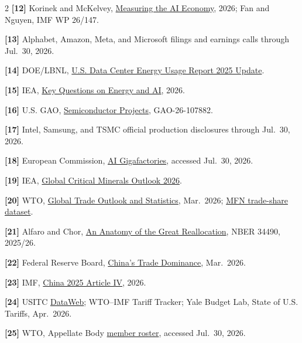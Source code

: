 \documentclass[10pt,letterpaper]{article}
\begin{document}
{\begin{multicols}{2}
\textbf{[12]} Korinek and McKelvey, \href{https://papers.ssrn.com/sol3/papers.cfm?abstract_id=6813982}{Measuring the AI Economy}, 2026; Fan and Nguyen, IMF WP 26/147.

\textbf{[13]} Alphabet, Amazon, Meta, and Microsoft filings and earnings calls through Jul.\ 30, 2026.

\textbf{[14]} DOE/LBNL, \href{https://www.energy.gov/powering-americas-ai-future-data-center-resource-hub}{U.S. Data Center Energy Usage Report 2025 Update}.

\textbf{[15]} IEA, \href{https://www.iea.org/reports/key-questions-on-energy-and-ai/executive-summary}{Key Questions on Energy and AI}, 2026.

\textbf{[16]} U.S. GAO, \href{https://www.gao.gov/products/gao-26-107882}{Semiconductor Projects}, GAO-26-107882.

\textbf{[17]} Intel, Samsung, and TSMC official production disclosures through Jul.\ 30, 2026.

\textbf{[18]} European Commission, \href{https://commission.europa.eu/topics/competitiveness/competitiveness-coordination-tool-projects/ai-gigafactories_en}{AI Gigafactories}, accessed Jul.\ 30, 2026.

\textbf{[19]} IEA, \href{https://www.iea.org/reports/global-critical-minerals-outlook-2026/executive-summary}{Global Critical Minerals Outlook 2026}.

\textbf{[20]} WTO, \href{https://www.wto.org/english/news_e/news26_e/stat_19mar26_329_e.htm}{Global Trade Outlook and Statistics}, Mar.\ 2026; \href{https://data.wto.org/en/dataset/mfnshare}{MFN trade-share dataset}.

\textbf{[21]} Alfaro and Chor, \href{https://www.nber.org/papers/w34490}{An Anatomy of the Great Reallocation}, NBER 34490, 2025/26.

\textbf{[22]} Federal Reserve Board, \href{https://www.federalreserve.gov/econres/notes/feds-notes/chinas-trade-dominance-and-the-role-of-industrial-policies-20260323.html}{China's Trade Dominance}, Mar.\ 2026.

\textbf{[23]} IMF, \href{https://www.imf.org/-/media/files/publications/cr/2026/english/1chnea2026001-source-pdf.pdf}{China 2025 Article IV}, 2026.

\textbf{[24]} USITC \href{https://dataweb.usitc.gov/}{DataWeb}; WTO--IMF Tariff Tracker; Yale Budget Lab, State of U.S. Tariffs, Apr.\ 2026.

\textbf{[25]} WTO, Appellate Body \href{https://www.wto.org/english/tratop_e/dispu_e/ab_members_descrp_e.htm}{member roster}, accessed Jul.\ 30, 2026.


\end{multicols}}
\end{document}
